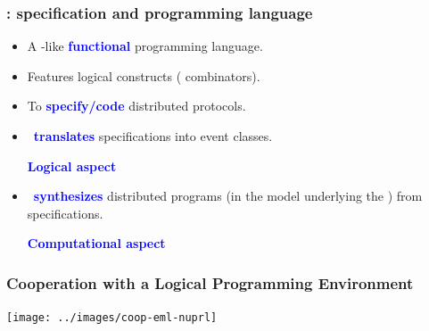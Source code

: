 \documentclass[12pt,red]{beamer}
\newcommand{\cemph}[1]{\textcolor{blue}{\textbf{#1}}}
\begin{document}
\begin{frame}
  \frametitle{\eml: specification and programming language}

  \begin{small}
  \begin{itemize}
  \item A \ML-like \cemph{functional} programming language.

  \item Features logical constructs (\cemph{\logicE} combinators).

  \item To \cemph{specify/code} distributed protocols.



  \item \eml\ \cemph{translates} specifications into event classes.

    \hspace{0.2in}\cemph{Logical aspect}

  \item \eml\ \cemph{synthesizes} distributed programs (in the model
    underlying the \logicE) from specifications.

    \hspace{0.2in}\cemph{Computational aspect}
  \end{itemize}
  \end{small}
\end{frame}


\begin{frame}
  \frametitle{Cooperation with a Logical Programming Environment}

  \texttt{[image: ../images/coop-eml-nuprl]}

\end{frame}
\end{document}
